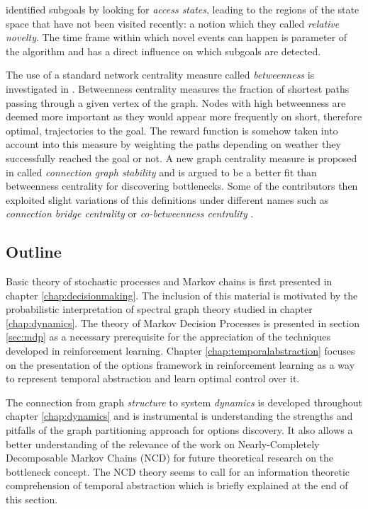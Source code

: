 \cite{Simsek2004} identified subgoals by looking for \textit{access states}, leading to the regions of the state space that have not been visited recently: a notion which they called \textit{relative novelty}. The time frame within which novel events can happen is parameter of the algorithm and has a direct influence on which subgoals are detected.

The use of a standard network centrality measure called \textit{betweenness} is investigated in \cite{Simsek2008}. Betweenness centrality measures the fraction of shortest paths passing through a given vertex of the graph. Nodes with high betweenness are deemed more important as they would appear more frequently on short, therefore optimal, trajectories to the goal. The reward function is somehow taken into account into this measure by weighting the paths depending on weather they successfully reached the goal or not. A new graph centrality measure is proposed in \cite{Rad2010} called \textit{connection graph stability} and is argued to be a better fit than betweenness centrality for discovering bottlenecks. Some of the contributors then exploited slight variations of this definitions under different names such as \textit{connection bridge centrality} or \textit{co-betweenness centrality} \parencite{Moradi2010}.  

\subsection{Outline}

Basic theory of stochastic processes and Markov chains is first presented in chapter \ref{chap:decisionmaking}. The inclusion of this material is motivated by the probabilistic interpretation of spectral graph theory studied in chapter \ref{chap:dynamics}. The theory of Markov Decision Processes is presented in section \ref{sec:mdp} as a necessary prerequisite for the appreciation of the techniques developed in reinforcement learning. Chapter \ref{chap:temporalabstraction} focuses on the presentation of the options framework \parencite{Sutton1999} in reinforcement learning as a way to represent temporal abstraction and learn optimal control over it.

The connection from graph \textit{structure} to system \textit{dynamics} is developed throughout chapter \ref{chap:dynamics} and is instrumental is understanding the strengths and pitfalls of the graph partitioning approach for options discovery. It also allows a better understanding of the relevance of the work on Nearly-Completely Decomposable Markov Chains (NCD) for future theoretical research on the bottleneck concept. The NCD theory seems to call for an information theoretic comprehension of temporal abstraction which is briefly explained at the end of this section.

